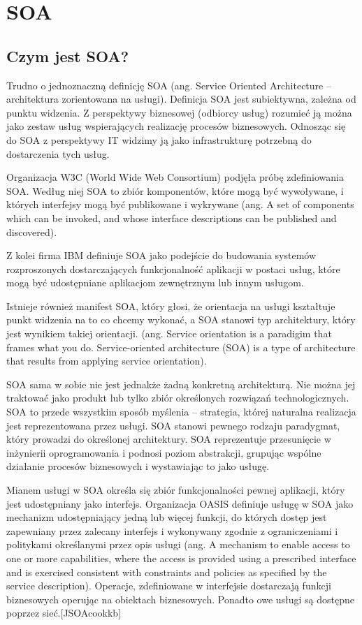 \section{SOA}
\subsection{Czym jest SOA?}
Trudno o jednoznaczną definicję SOA (ang. Service Oriented Architecture – architektura zorientowana na usługi). Definicja SOA jest subiektywna, zależna od punktu widzenia. Z perspektywy biznesowej (odbiorcy usług) rozumieć ją można jako zestaw usług wspierających realizację procesów biznesowych. Odnosząc się do SOA z perspektywy IT widzimy ją jako infrastrukturę potrzebną do dostarczenia tych usług.
	
Organizacja W3C (World Wide Web Consortium) podjęła próbę zdefiniowania SOA. Według niej SOA to zbiór komponentów, które mogą być wywoływane, i których interfejsy mogą być publikowane i wykrywane (ang. A set of components which can be invoked, and whose interface descriptions can be published and discovered).

Z kolei firma IBM definiuje SOA jako podejście do budowania systemów rozproszonych dostarczających funkcjonalność aplikacji w postaci usług, które mogą być udostępniane aplikacjom zewnętrznym lub innym usługom. \cite{PlatIntGor}

Istnieje również manifest SOA, który głosi, że orientacja na usługi kształtuje punkt widzenia na to co chcemy wykonać, a SOA stanowi typ architektury, który jest wynikiem takiej orientacji. (ang. Service orientation is a paradigim that frames what you do. Service-oriented architecture (SOA) is a type of architecture that results from applying service orientation). \cite{SOAManifestoOrg}

SOA sama w sobie nie jest jednakże żadną konkretną architekturą. Nie można jej traktować jako produkt lub tylko zbiór określonych rozwiązań technologicznych. SOA to przede wszystkim sposób myślenia – strategia, której naturalna realizacja jest reprezentowana przez usługi. \cite{SOAsdj102009,SOAwJBBC} SOA stanowi pewnego rodzaju paradygmat, który prowadzi do określonej architektury. \cite{SOAsdj102009} SOA reprezentuje przesunięcie w inżynierii oprogramowania i podnosi poziom abstrakcji, grupując wspólne działanie procesów biznesowych i wystawiając to jako usługę. \cite{CompSOAMet}
	
Mianem usługi w SOA określa się zbiór funkcjonalności pewnej aplikacji, który jest udostępniany jako interfejs. \cite{SOAawidptas} Organizacja OASIS definiuje usługę w SOA jako mechanizm udostępniający jedną lub więcej funkcji, do których dostęp jest zapewniany przez zalecany interfejs i wykonywany zgodnie z ograniczeniami i politykami określanymi przez opis usługi (ang. A mechanism to enable access to one or more capabilities, where the access is provided using a prescribed interface and is exercised consistent with constraints and policies as specified by the service description). Operacje, zdefiniowane w interfejsie dostarczają funkcji biznesowych operując na obiektach biznesowych. Ponadto owe usługi są dostępne poprzez sieć.[JSOAcookkb] 

